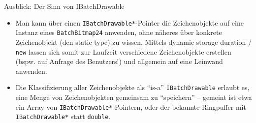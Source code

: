 \begin{frame}[fragile]{Ausblick: Der Sinn von IBatchDrawable}
	\begin{itemize}
		\item Man kann über einen \verb|IBatchDrawable*|-Pointer die Zeichenobjekte auf eine Instanz eines \verb|BatchBitmap24| anwenden, ohne näheres über konkrete Zeichenobjekt (den static type) zu wissen. Mittels dynamic storage duration / \verb|new| lassen sich somit zur Laufzeit verschiedene Zeichenobjekte erstellen (bspw. auf Anfrage des Benutzers!) und allgemein auf eine Leinwand anwenden.
		\item Die Klassifizierung aller Zeichenobjekte als \enquote{is-a} \verb|IBatchDrawable| erlaubt es, eine Menge von Zeichenobjekten gemeinsam zu \enquote{speichern} -- gemeint ist etwa ein Array von \verb|IBatchDrawable*|-Pointern, oder der bekannte Ringpuffer mit \verb|IBatchDrawable*| statt \verb|double|.
	\end{itemize}
\end{frame}
